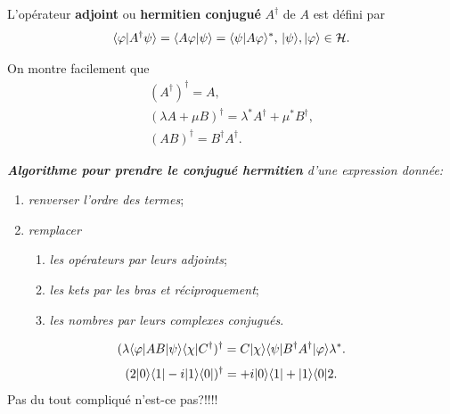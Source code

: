 \label{sec:HermFctOp}

L'opérateur \textbf{adjoint} ou \textbf{hermitien conjugué} $A^{\dagger}$ de
$A$ est défini par%
\begin{equation}
\langle\varphi\vert A^{\dagger}\psi\rangle =\langle A\varphi\vert\psi\rangle
=\langle\psi\vert A\varphi\rangle^{\ast}\text{, }\vert\psi\rangle,\vert\varphi\rangle
\in\mathcal{H}.
\end{equation}

On montre facilement que %
\begin{subequations}%
\begin{align}
(A^{\dagger})^{\dagger}=A,\\
(\lambda A+\mu B) ^{\dagger}=\lambda^{\ast}A^{\dagger}+\mu^{\ast}B^{\dagger},\\
(AB)^{\dagger}=B^{\dagger}A^{\dagger}.
\end{align}%
\end{subequations}%

\medskip
\colorbox[gray]{0.8}{
\parbox[c]{0.9\textwidth}{
\emph{\textbf{Algorithme pour prendre le conjugué hermitien} d'une
expression donnée:}

\begin{enumerate}
\item \emph{renverser l'ordre des termes};

\item \emph{remplacer}

\begin{enumerate}
\item \emph{les opérateurs par leurs adjoints};

\item \emph{les kets par les bras et réciproquement};

\item \emph{les nombres par leurs complexes conjugués}.%
\end{enumerate}
\end{enumerate}
}}

\begin{example}

\begin{equation}
(\lambda\langle\varphi\vert AB\vert\psi\rangle\langle\chi\vert C^{\dagger})^{\dagger}=C\vert\chi\rangle
\langle\psi\vert B^{\dagger}A^{\dagger}\vert\varphi\rangle \lambda^{\ast}.
\end{equation}
\begin{equation}
(2\vert0\rangle\langle1\vert-i\vert1\rangle\langle0\vert)^{\dag}=+i\vert0\rangle\langle1\vert+\vert1\rangle\langle0\vert2.
\end{equation}
Pas du tout compliqué n'est-ce pas?!!!!
\end{example}

